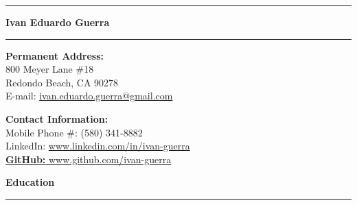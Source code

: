 \documentclass[10pt,letterpaper]{article}
\begin{document}

\hrule
\begin{center}
    \begin{LARGE}
        \textbf{Ivan Eduardo Guerra}
    \end{LARGE}
\end{center}
\hrule

\medskip

\begin{minipage}[t]{0.53\textwidth}
    \begin{flushleft}
        \textbf{Permanent Address:}\\
        800 Meyer Lane \#18\\
        Redondo Beach, CA 90278\\
        E-mail: \href{mailto:ivan.eduardo.guerra@gmail.com}{ivan.eduardo.guerra@gmail.com}
    \end{flushleft}
\end{minipage}
\begin{minipage}[t]{0.44\textwidth}
    \begin{flushright}
        \begin{flushleft}
            \textbf{Contact Information:}\\
            Mobile Phone \#: (580) 341-8882\\
            LinkedIn: \url{www.linkedin.com/in/ivan-guerra}\\
            \underline{\textbf{GitHub:} \url{www.github.com/ivan-guerra}}
        \end{flushleft}
    \end{flushright}
\end{minipage}

\smallskip

\begin{large}
    \textbf{Education}
\end{large}

\smallskip \hrule \smallskip
\end{document}

